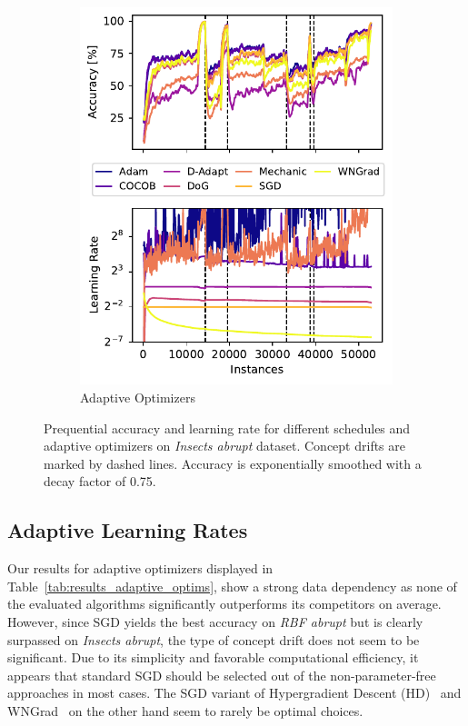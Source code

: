 \documentclass[runningheads]{llncs}
\begin{document}
\begin{figure}[ht]
\begin{subfigure}[b]{0.496\textwidth}
		\includegraphics[width=\textwidth]{figures/lr_norms_optims_insects_abrupt.pdf}
		\caption{Adaptive Optimizers}
		\label{fig:prequential_optims_insects}
	\end{subfigure}
	\caption{Prequential accuracy and learning rate for different schedules and adaptive optimizers on \textit{Insects abrupt} dataset. Concept drifts are marked by dashed lines. Accuracy is exponentially smoothed with a decay factor of 0.75.}
\end{figure}

\subsection{Adaptive Learning Rates}

Our results for adaptive optimizers displayed in Table~\ref{tab:results_adaptive_optims}, show a strong data dependency as none of the evaluated algorithms significantly outperforms its competitors on average.
However, since SGD yields the best accuracy on \textit{RBF abrupt} but is clearly surpassed on \textit{Insects abrupt}, the type of concept drift does not seem to be significant.
Due to its simplicity and favorable computational efficiency, it appears that standard SGD should be selected out of the non-parameter-free approaches in most cases.
The SGD variant of Hypergradient Descent (HD)~\cite{baydinOnlineLearningRate2018} and WNGrad~\cite{wuWNGradLearnLearning2020} on the other hand seem to rarely be optimal choices.
\end{document}
